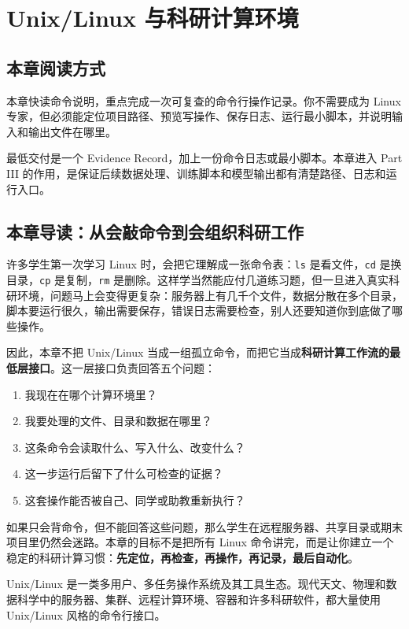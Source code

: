 \chapter{Unix/Linux 与科研计算环境}

\section{本章阅读方式}

本章快读命令说明，重点完成一次可复查的命令行操作记录。你不需要成为 Linux 专家，但必须能定位项目路径、预览写操作、保存日志、运行最小脚本，并说明输入和输出文件在哪里。

最低交付是一个 Evidence Record，加上一份命令日志或最小脚本。本章进入 Part III 的作用，是保证后续数据处理、训练脚本和模型输出都有清楚路径、日志和运行入口。

\section{本章导读：从会敲命令到会组织科研工作}

许多学生第一次学习 Linux 时，会把它理解成一张命令表：\texttt{ls} 是看文件，\texttt{cd} 是换目录，\texttt{cp} 是复制，\texttt{rm} 是删除。这样学当然能应付几道练习题，但一旦进入真实科研环境，问题马上会变得更复杂：服务器上有几千个文件，数据分散在多个目录，脚本要运行很久，输出需要保存，错误日志需要检查，别人还要知道你到底做了哪些操作。

因此，本章不把 Unix/Linux 当成一组孤立命令，而把它当成\textbf{科研计算工作流的最低层接口}。这一层接口负责回答五个问题：

\begin{enumerate}
    \item 我现在在哪个计算环境里？
    \item 我要处理的文件、目录和数据在哪里？
    \item 这条命令会读取什么、写入什么、改变什么？
    \item 这一步运行后留下了什么可检查的证据？
    \item 这套操作能否被自己、同学或助教重新执行？
\end{enumerate}

如果只会背命令，但不能回答这些问题，那么学生在远程服务器、共享目录或期末项目里仍然会迷路。本章的目标不是把所有 Linux 命令讲完，而是让你建立一个稳定的科研计算习惯：\textbf{先定位，再检查，再操作，再记录，最后自动化}。

\begin{defbox}
Unix/Linux 是一类多用户、多任务操作系统及其工具生态。现代天文、物理和数据科学中的服务器、集群、远程计算环境、容器和许多科研软件，都大量使用 Unix/Linux 风格的命令行接口。
\end{defbox}

